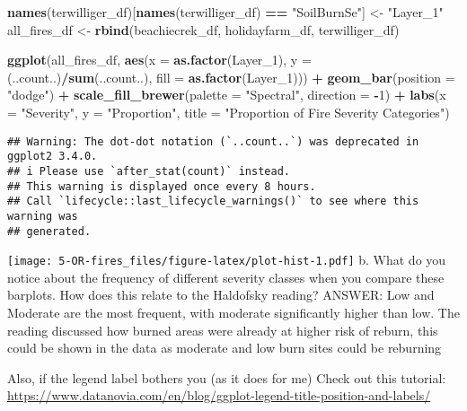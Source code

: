 \documentclass[
]{article}
\newenvironment{Shaded}{\begin{snugshade}}{\end{snugshade}}
\newcommand{\AttributeTok}[1]{\textcolor[rgb]{0.13,0.29,0.53}{#1}}
\newcommand{\DecValTok}[1]{\textcolor[rgb]{0.00,0.00,0.81}{#1}}
\newcommand{\FunctionTok}[1]{\textcolor[rgb]{0.13,0.29,0.53}{\textbf{#1}}}
\newcommand{\NormalTok}[1]{#1}
\newcommand{\OtherTok}[1]{\textcolor[rgb]{0.56,0.35,0.01}{#1}}
\newcommand{\SpecialCharTok}[1]{\textcolor[rgb]{0.81,0.36,0.00}{\textbf{#1}}}
\newcommand{\StringTok}[1]{\textcolor[rgb]{0.31,0.60,0.02}{#1}}
\begin{document}
\begin{Shaded}
\begin{Highlighting}[]
\FunctionTok{names}\NormalTok{(terwilliger\_df)[}\FunctionTok{names}\NormalTok{(terwilliger\_df) }\SpecialCharTok{==} \StringTok{"SoilBurnSe"}\NormalTok{] }\OtherTok{\textless{}{-}} \StringTok{"Layer\_1"}
\NormalTok{all\_fires\_df }\OtherTok{\textless{}{-}} \FunctionTok{rbind}\NormalTok{(beachiecrek\_df, holidayfarm\_df, terwilliger\_df)}

\FunctionTok{ggplot}\NormalTok{(all\_fires\_df, }\FunctionTok{aes}\NormalTok{(}\AttributeTok{x =} \FunctionTok{as.factor}\NormalTok{(Layer\_1), }\AttributeTok{y =}\NormalTok{ (..count..)}\SpecialCharTok{/}\FunctionTok{sum}\NormalTok{(..count..), }\AttributeTok{fill =} \FunctionTok{as.factor}\NormalTok{(Layer\_1))) }\SpecialCharTok{+}
  \FunctionTok{geom\_bar}\NormalTok{(}\AttributeTok{position =} \StringTok{"dodge"}\NormalTok{) }\SpecialCharTok{+}
  \FunctionTok{scale\_fill\_brewer}\NormalTok{(}\AttributeTok{palette =} \StringTok{"Spectral"}\NormalTok{, }\AttributeTok{direction =} \SpecialCharTok{{-}}\DecValTok{1}\NormalTok{) }\SpecialCharTok{+}
  \FunctionTok{labs}\NormalTok{(}\AttributeTok{x =} \StringTok{"Severity"}\NormalTok{, }\AttributeTok{y =} \StringTok{"Proportion"}\NormalTok{, }\AttributeTok{title =} \StringTok{"Proportion of Fire Severity Categories"}\NormalTok{)}
\end{Highlighting}
\end{Shaded}

\begin{verbatim}
## Warning: The dot-dot notation (`..count..`) was deprecated in ggplot2 3.4.0.
## i Please use `after_stat(count)` instead.
## This warning is displayed once every 8 hours.
## Call `lifecycle::last_lifecycle_warnings()` to see where this warning was
## generated.
\end{verbatim}

\texttt{[image: 5-OR-fires\_files/figure-latex/plot-hist-1.pdf]} b. What
do you notice about the frequency of different severity classes when you
compare these barplots. How does this relate to the Haldofsky reading?
ANSWER: Low and Moderate are the most frequent, with moderate
significantly higher than low. The reading discussed how burned areas
were already at higher risk of reburn, this could be shown in the data
as moderate and low burn sites could be reburning

Also, if the legend label bothers you (as it does for me) Check out this
tutorial:
\url{https://www.datanovia.com/en/blog/ggplot-legend-title-position-and-labels/}
\end{document}
